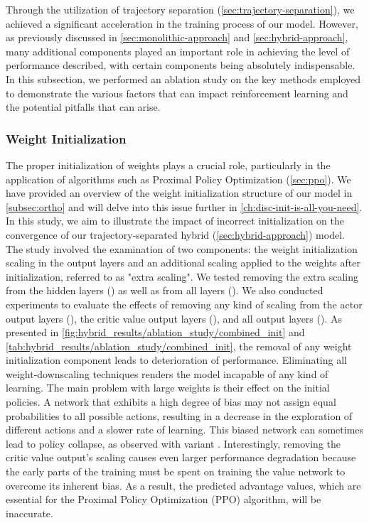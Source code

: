 \noindent Through the utilization of trajectory separation (\autoref{sec:trajectory-separation}), we achieved a significant acceleration in the training process of our model. However, as previously discussed in \autoref{sec:monolithic-approach} and \autoref{sec:hybrid-approach}, many additional components played an important role in achieving the level of performance described, with certain components being absolutely indispensable. In this subsection, we performed an ablation study on the key methods employed to demonstrate the various factors that can impact reinforcement learning and the potential pitfalls that can arise.

\subsubsection{Weight Initialization}

\noindent The proper initialization of weights plays a crucial role, particularly in the application of algorithms such as Proximal Policy Optimization (\autoref{sec:ppo}). We have provided an overview of the weight initialization structure of our model in \autoref{subsec:ortho} and will delve into this issue further in \autoref{ch:disc-init-is-all-you-need}. In this study, we aim to illustrate the impact of incorrect initialization on the convergence of our trajectory-separated hybrid (\autoref{sec:hybrid-approach}) model. The study involved the examination of two components: the weight initialization scaling in the output layers and an additional scaling applied to the weights after initialization, referred to as "extra scaling". We tested removing the extra scaling from the hidden layers () as well as from all layers (). We also conducted experiments to evaluate the effects of removing any kind of scaling from the actor output layers (), the critic value output layers (), and all output layers (). As presented in \autoref{fig:hybrid_results/ablation_study/combined_init} and \autoref{tab:hybrid_results/ablation_study/combined_init}, the removal of any weight initialization component leads to deterioration of performance. Eliminating all weight-downscaling techniques renders the model incapable of any kind of learning. The main problem with large weights is their effect on the initial policies. A network that exhibits a high degree of bias may not assign equal probabilities to all possible actions, resulting in a decrease in the exploration of different actions and a slower rate of learning. This biased network can sometimes lead to policy collapse, as observed with variant . Interestingly, removing the critic value output's scaling causes even larger performance degradation because the early parts of the training must be spent on training the value network to overcome its inherent bias. As a result, the predicted advantage values, which are essential for the Proximal Policy Optimization (PPO) algorithm, will be inaccurate.

